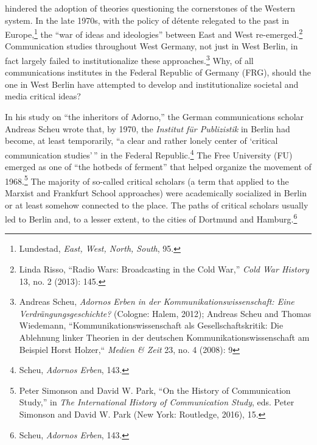 \documentclass{tufte-handout}
\begin{document}
hindered the adoption of theories questioning the cornerstones of the
Western system. In the late 1970s, with the policy of détente relegated
to the past in Europe,\footnote{Lundestad, \emph{East, West, North,
  South}, 95.} the ``war of ideas and ideologies'' between East and West
re-emerged.\footnote{Linda Risso, ``Radio Wars: Broadcasting in the Cold
  War,'' \emph{Cold War History} 13, no. 2 (2013): 145.} Communication
studies throughout West Germany, not just in West Berlin, in fact
largely failed to institutionalize these approaches.\footnote{Andreas
  Scheu, \emph{Adornos Erben in der Kommunikationswissenschaft: Eine
  Verdrängungsgeschichte?} (Cologne: Halem, 2012); Andreas Scheu and
  Thomas Wiedemann, ``Kommunikationswissenschaft als
  Gesellschaftskritik: Die Ablehnung linker Theorien in der deutschen
  Kommunikationswissenschaft am Beispiel Horst Holzer,`` \emph{Medien \&
  Zeit} 23, no. 4 (2008): 9} Why, of all communications institutes in
the Federal Republic of Germany (FRG), should the one in West Berlin
have attempted to develop and institutionalize societal and media
critical ideas?

In his study on ``the inheritors of Adorno,'' the German communications
scholar Andreas Scheu wrote that, by 1970, the \emph{Institut für
Publizistik} in Berlin had become, at least temporarily, ``a clear and
rather lonely center of `critical communication studies'\,'' in the
Federal Republic.\footnote{Scheu, \emph{Adornos Erben}, 143.} The Free
University (FU) emerged as one of ``the hotbeds of ferment'' that helped
organize the movement of 1968.\footnote{Peter Simonson and David W.
  Park, ``On the History of Communication Study,'' in \emph{The
  International History of Communication Study}, eds. Peter Simonson and
  David W. Park (New York: Routledge, 2016), 15.} The majority of
so-called critical scholars (a term that applied to the Marxist and
Frankfurt School approaches) were academically socialized in Berlin or
at least somehow connected to the place. The paths of critical scholars
usually led to Berlin and, to a lesser extent, to the cities of Dortmund
and Hamburg.\footnote{Scheu, \emph{Adornos Erben}, 143.}
\end{document}
